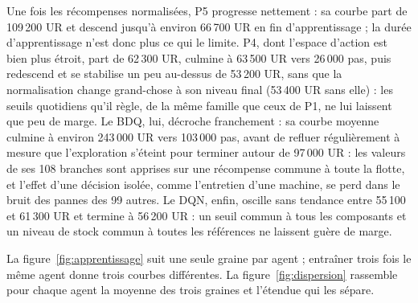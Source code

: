 Une fois les récompenses normalisées, P5 progresse nettement : sa courbe part de 109\,200 UR et descend jusqu'à environ 66\,700 UR en fin d'apprentissage ; la durée d'apprentissage n'est donc plus ce qui le limite. P4, dont l'espace d'action est bien plus étroit, part de 62\,300 UR, culmine à 63\,500 UR vers 26\,000 pas, puis redescend et se stabilise un peu au-dessus de 53\,200 UR, sans que la normalisation change grand-chose à son niveau final (53\,400 UR sans elle) : les seuils quotidiens qu'il règle, de la même famille que ceux de P1, ne lui laissent que peu de marge. Le BDQ, lui, décroche franchement : sa courbe moyenne culmine à environ 243\,000 UR vers 103\,000 pas, avant de refluer régulièrement à mesure que l'exploration s'éteint pour terminer autour de 97\,000 UR : les valeurs de ses 108 branches sont apprises sur une récompense commune à toute la flotte, et l'effet d'une décision isolée, comme l'entretien d'une machine, se perd dans le bruit des pannes des 99 autres. Le DQN, enfin, oscille sans tendance entre 55\,100 et 61\,300 UR et termine à 56\,200 UR : un seuil commun à tous les composants et un niveau de stock commun à toutes les références ne laissent guère de marge.

La figure~\ref{fig:apprentissage} suit une seule graine par agent ; entraîner trois fois le même agent donne trois courbes différentes. La figure~\ref{fig:dispersion} rassemble pour chaque agent la moyenne des trois graines et l'étendue qui les sépare.

